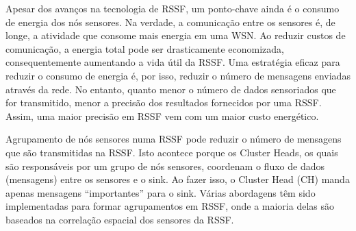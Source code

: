 \documentclass{acm_proc_article-sp}
\begin{document}
Apesar dos avanços na tecnologia de RSSF, um ponto-chave ainda é o consumo de
energia dos nós sensores. Na verdade, a comunicação entre os sensores é, de
longe, a atividade que consome mais energia em uma WSN.
Ao reduzir custos de comunicação, a energia total pode ser drasticamente
economizada, consequentemente aumentando a vida útil da RSSF. Uma estratégia
eficaz para reduzir o consumo de energia é, por isso, reduzir o número de
mensagens enviadas através da rede.
No entanto, quanto menor o número de dados sensoriados que for transmitido,
menor a precisão dos resultados fornecidos por uma RSSF. Assim, uma maior
precisão em RSSF vem com um maior custo energético.
\vspace*{-.3cm}

Agrupamento de nós sensores numa RSSF pode reduzir o número de mensagens que são
transmitidas na RSSF. Isto acontece porque os Cluster Heads, os quais são
responsáveis por um grupo de nós sensores, coordenam o fluxo de dados
(mensagens) entre os sensores e o sink. Ao fazer isso, o Cluster Head (CH) manda
apenas mensagens ``importantes'' para o sink. Várias abordagens têm sido
implementadas para formar agrupamentos em RSSF, onde a maioria delas são
baseados na correlação espacial dos sensores da RSSF.
\vspace*{-.3cm}
\end{document}
